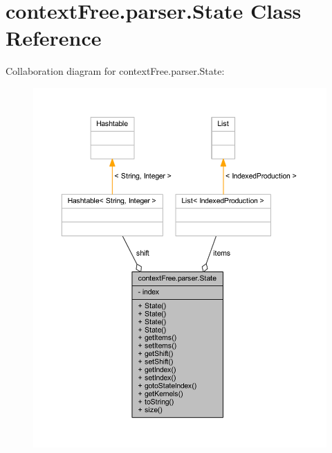 \hypertarget{classcontext_free_1_1parser_1_1_state}{\section{context\-Free.\-parser.\-State Class Reference}
\label{classcontext_free_1_1parser_1_1_state}
}


Collaboration diagram for context\-Free.\-parser.\-State\-:\nopagebreak
\begin{figure}[H]
\begin{center}
\leavevmode
\includegraphics[width=350pt]{classcontext_free_1_1parser_1_1_state__coll__graph}
\end{center}
\end{figure}
